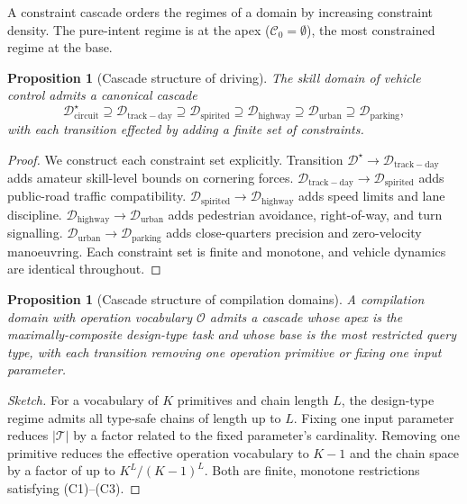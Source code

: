 \documentclass[twocolumn,11pt,a4paper]{article}
\newtheorem{proposition}[theorem]{Proposition}
\newcommand{\cD}{\mathcal{D}}
\newcommand{\cT}{\mathcal{T}}
\newcommand{\cO}{\mathcal{O}}
\newcommand{\cC}{\mathcal{C}}
\begin{document}
A constraint cascade orders the regimes of a domain by increasing constraint density. The pure-intent regime is at the apex ($\cC_0 = \emptyset$), the most constrained regime at the base.

\begin{proposition}[Cascade structure of driving]
\label{prop:cascade-driving}
The skill domain of vehicle control admits a canonical cascade
\begin{equation}
\cD^\star_{\mathrm{circuit}} \supseteq \cD_{\mathrm{track-day}} \supseteq \cD_{\mathrm{spirited}} \supseteq \cD_{\mathrm{highway}} \supseteq \cD_{\mathrm{urban}} \supseteq \cD_{\mathrm{parking}},
\end{equation}
with each transition effected by adding a finite set of constraints.
\end{proposition}

\begin{proof}
We construct each constraint set explicitly. Transition $\cD^\star \to \cD_{\mathrm{track-day}}$ adds amateur skill-level bounds on cornering forces. $\cD_{\mathrm{track-day}} \to \cD_{\mathrm{spirited}}$ adds public-road traffic compatibility. $\cD_{\mathrm{spirited}} \to \cD_{\mathrm{highway}}$ adds speed limits and lane discipline. $\cD_{\mathrm{highway}} \to \cD_{\mathrm{urban}}$ adds pedestrian avoidance, right-of-way, and turn signalling. $\cD_{\mathrm{urban}} \to \cD_{\mathrm{parking}}$ adds close-quarters precision and zero-velocity manoeuvring. Each constraint set is finite and monotone, and vehicle dynamics are identical throughout.
\end{proof}

\begin{proposition}[Cascade structure of compilation domains]
\label{prop:cascade-compilation}
A compilation domain with operation vocabulary $\cO$ admits a cascade whose apex is the maximally-composite design-type task and whose base is the most restricted query type, with each transition removing one operation primitive or fixing one input parameter.
\end{proposition}

\begin{proof}[Sketch]
For a vocabulary of $K$ primitives and chain length $L$, the design-type regime admits all type-safe chains of length up to $L$. Fixing one input parameter reduces $|\cT|$ by a factor related to the fixed parameter's cardinality. Removing one primitive reduces the effective operation vocabulary to $K-1$ and the chain space by a factor of up to $K^L / (K-1)^L$. Both are finite, monotone restrictions satisfying (C1)--(C3).
\end{proof}
\end{document}
